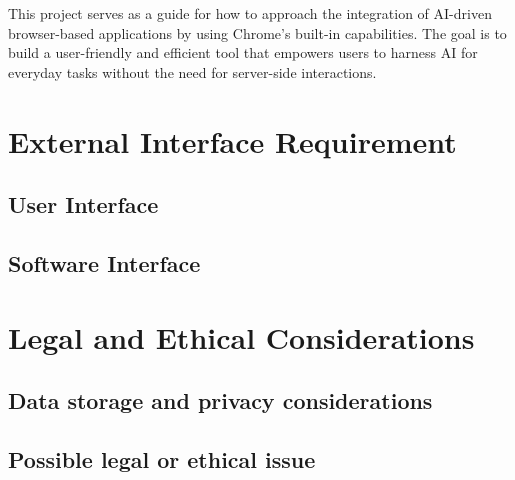 \documentclass{article}
\begin{document}
This project serves as a guide for how to approach the integration of AI-driven browser-based applications by using Chrome’s built-in capabilities. The goal is to build a user-friendly and efficient tool that empowers users to harness AI for everyday tasks without the need for server-side interactions.

\section{External Interface Requirement}
\subsection{User Interface}

\subsection{Software Interface}


\section{Legal and Ethical Considerations}
\subsection{Data storage and privacy considerations}

\subsection{Possible legal or ethical issue}

\printglossaries
\end{document}
